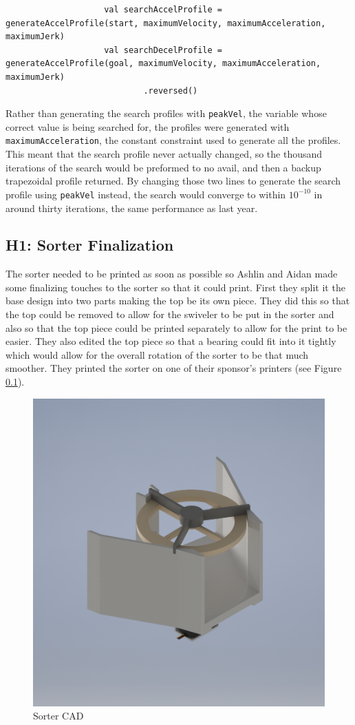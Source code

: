 \documentclass{article}
\begin{document}
\begin{lstlisting}
                    val searchAccelProfile = generateAccelProfile(start, maximumVelocity, maximumAcceleration, maximumJerk)
                    val searchDecelProfile = generateAccelProfile(goal, maximumVelocity, maximumAcceleration, maximumJerk)
                            .reversed()
\end{lstlisting}

Rather than generating the search profiles with \texttt{peakVel}, the variable whose correct value is being searched for, the profiles were generated with \texttt{maximumAcceleration}, the constant constraint used to generate all the profiles. This meant that the search profile never actually changed, so the thousand iterations of the search would be preformed to no avail, and then a backup trapezoidal profile returned. By changing those two  lines to generate the search profile using \texttt{peakVel} instead, the search would converge to within $10^{-10}$ in around thirty iterations, the same performance as last year. 

\subsection{H1: Sorter Finalization}

The sorter needed to be printed as soon as possible so Ashlin and Aidan made some finalizing touches to the sorter so that it could print. First they split it the base design into two parts making the top be its own piece. They did this so that the top could be removed to allow for the swiveler to be put in the sorter and also so that the top piece could be printed separately to allow for the print to be easier. They also edited the top piece so that a bearing could fit into it tightly which would allow for the overall rotation of the sorter to be that much smoother. They printed the sorter on one of their sponsor's printers (see Figure \ref{}).

\begin{figure}
    \centering
    \includegraphics[width=.6 \textwidth, ]{10_11-05/images/og_sorter[1].png}
    \caption{Sorter CAD}
    \label{fig:Sorter CAD}
\end{figure}
\end{document}
